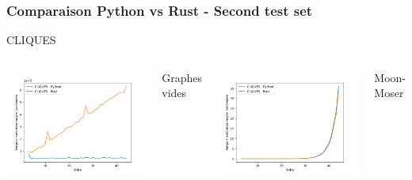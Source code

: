 \documentclass{beamer}
\begin{document}
\begin{frame}
\frametitle{Comparaison Python vs Rust - Second test set}
CLIQUES
  \begin{columns}
    \centering
    \includegraphics[width=\textwidth]{images/total_CLIQUES_new_pyrust_pivot_empty_plot.png}
    \caption{Graphes vides}
    \centering
    \includegraphics[width=\textwidth]{images/total_CLIQUES_new_pyrust_pivot_turan_plot.png}
    \caption{Moon-Moser}
    \centering

\end{columns}
\end{frame}
\end{document}
